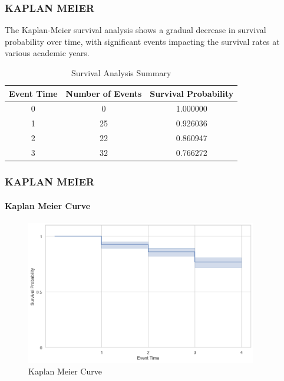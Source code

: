 \documentclass[12pt]{beamer}
\begin{document}
 
\begin{frame}

    \frametitle{KAPLAN MEIER}
    
    \begin{block}{}
     \vspace{0.5cm}  
        The Kaplan-Meier survival analysis shows a gradual decrease in survival probability over time, with significant events impacting the survival rates at various academic years.
    \end{block}
    
    
   \begin{table}[h!]
\centering
\begin{tabular}{|c|c|c|}
\hline
\textbf{Event Time} & \textbf{Number of Events} & \textbf{Survival Probability} \\
\hline
0& 0  & 1.000000 \\
1& 25 & 0.926036 \\
2& 22 & 0.860947 \\
3& 32 & 0.766272 \\ \hline
\end{tabular}
\caption{Survival Analysis Summary}
\label{Kaplan Meier Table}
\end{table}


\end{frame}


\begin{frame}
    \frametitle{KAPLAN MEIER }
     \framesubtitle{Kaplan Meier Curve}

    
		\begin{figure}[H]
			\centering
			\includegraphics[width=0.9\textwidth]{Figure 4/4.1.png}
			\hfill
			\caption{Kaplan Meier Curve}
			
		\end{figure}

\end{frame}
\end{document}
